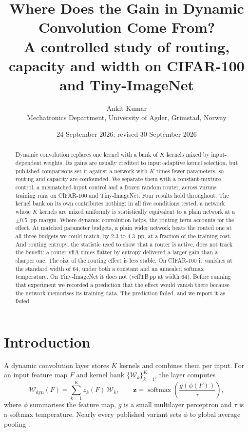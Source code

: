 \documentclass[10pt,a4paper]{article}
\title{\vspace{-1.3cm}\textbf{Where Does the Gain in Dynamic Convolution Come From?}\\[3pt]
\large A controlled study of routing, capacity and width on CIFAR-100 and Tiny-ImageNet}
\author{Ankit Kumar\\\small Mechatronics Department, University of Agder, Grimstad, Norway}
\date{\small 24 September 2026; revised 30 September 2026}
\newcommand{\zv}{\mathbf{z}}
\newcommand{\V}[1]{\csname v#1\endcsname}
\begin{document}
\maketitle
\vspace{-0.6cm}

\begin{abstract}
\noindent
Dynamic convolution replaces one kernel with a bank of $K$ kernels mixed
by input-dependent weights. Its gains are usually credited to
input-adaptive kernel selection, but published comparisons set it
against a network with $K$ times fewer parameters, so routing and
capacity are confounded. We separate them with a constant-mixture
control, a mismatched-input control and a frozen random router, across
\V{nruns} training runs on CIFAR-100 and Tiny-ImageNet. Four results hold
throughout. The kernel bank on its own contributes nothing: in all five
conditions tested, a network whose $K$ kernels are mixed uniformly is
statistically equivalent to a plain network at a $\pm$\SI{0.5}{pp}
margin. Where dynamic convolution helps, the routing term accounts for
the effect. At matched parameter budgets, a plain wider network beats the
routed one at all three budgets we could match, by 2.3 to
\SI{4.3}{pp}, at a fraction of the training cost. And routing entropy,
the statistic used to show that a router is active, does not track the
benefit: a router \V{flA} times flatter by entropy delivered a larger gain
than a sharper one. The size of the routing effect is less stable. On
CIFAR-100 it vanishes at the standard width of 64, under both a constant
and an annealed softmax temperature. On Tiny-ImageNet it does not
(\V{effTB}\,pp at width 64). Before running that experiment we recorded
a prediction that the effect would vanish there because the network
memorises its training data. The prediction failed, and we report it as
failed.
\end{abstract}

\section{Introduction}

A dynamic convolution layer stores $K$ kernels and combines them per
input. For an input feature map $F$ and kernel bank
$\{\mathcal{W}_k\}_{k=1}^{K}$, the layer computes
\begin{equation}
\mathcal{W}_{\text{dyn}}(F)=\sum_{k=1}^{K} z_k(F)\,\mathcal{W}_k,
\qquad
\zv=\operatorname{softmax}\!\left(\frac{g(\phi(F))}{\tau}\right),
\label{eq:dynconv}
\end{equation}
where $\phi$ summarises the feature map, $g$ is a small multilayer
perceptron and $\tau$ is a softmax temperature. Nearly every published
variant sets $\phi$ to global average pooling
\citep{yang2019condconv,chen2020dynamic}.
\end{document}
